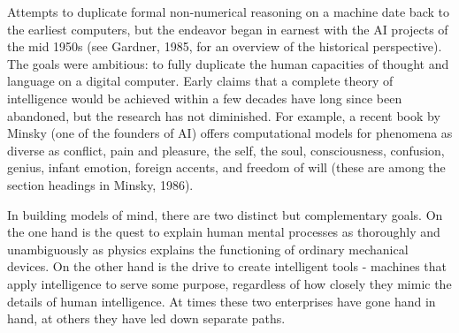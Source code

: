 \documentclass[12pt]{article}
\begin{document}
Attempts to duplicate formal non-numerical reasoning on a machine date back to the earliest computers, but the endeavor began in earnest with the AI projects of the mid 1950s (see Gardner, 1985, for an overview of the historical perspective). The goals were ambitious: to fully duplicate the human capacities of thought and language on a digital computer. Early claims that a complete theory of intelligence would be achieved within a few decades have long since been abandoned, but the research has not diminished. For example, a recent book by Minsky (one of the founders of AI) offers computational models for phenomena as diverse as conflict, pain and pleasure, the self, the soul, consciousness, confusion, genius, infant emotion, foreign accents, and freedom of will (these are among the section headings in Minsky, 1986).

In building models of mind, there are two distinct but complementary goals. On the one hand is the quest to explain human mental processes as thoroughly and unambiguously as physics explains the functioning of ordinary mechanical devices. On the other hand is the drive to create intelligent tools - machines that apply intelligence to serve some purpose, regardless of how closely they mimic the details of human intelligence. At times these two enterprises have gone hand in hand, at others they have led down separate paths.
\end{document}
